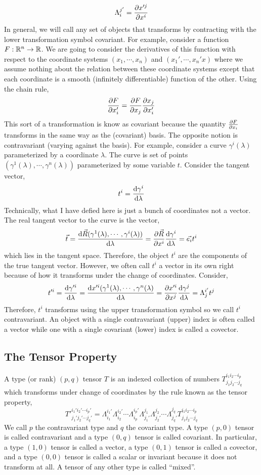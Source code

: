 \documentclass[11pt, a4paper]{article}
\begin{document}
\[ \Lambda^{j'}_{i} = \frac{\partial{x'^j}}{\partial{x^i}} \]
In general, we will call any set of objects that transforms by contracting with the lower transformation symbol covariant. For example,
consider a function $F : \mathbb{R}^n \to \mathbb{R}$. We are going to consider the derivatives of this function with respect to the coordinate systems $(x_1, \cdots, x_n)$ and $(x_1', \cdots, x_n'x)$ where we assume nothing about the relation between these coordinate systems except that each coordinate is a smooth (infinitely differentiable) function of the other. Using the chain rule,
\[ \frac{\partial{F}}{\partial{x'_i}} = \frac{\partial{F}}{\partial{x_j}} \frac{\partial{x_j}}{\partial{x'_i}} \]
This sort of a transformation is know as covariant because the quantity $\frac{\partial{F}}{\partial{x_i}}$ transforms in the same way as the (covariant) basis.
The opposite notion is contravariant (varying against the basis). For example, consider a curve $\gamma^i(\lambda)$ parameterized by a coordinate $\lambda$. The curve is set of points $(\gamma^1(\lambda), \cdots, \gamma^n(\lambda))$ parameterized by some variable $t$. Consider the tangent vector,
\[ t^i = \frac{\mathrm{d}\gamma^i}{\mathrm{d}\lambda} \]
Technically, what I have defied here is just a bunch of coordinates not a vector. The real tangent vector to the curve is the vector,
\[\vec{t} = \frac{\mathrm{d}\vec{R}(\gamma^1(\lambda), \cdots, \gamma^i(\lambda))}{\mathrm{d}\lambda} = \frac{\partial{\vec{R}}}{\partial{x^i}} \frac{\mathrm{d}\gamma^i}{\mathrm{d}\lambda} = \vec{e_i} t^i\] 
which lies in the tangent space. Therefore, the object $t^i$ are the components of the true tangent vector. However, we often call $t^i$ a vector in its own right because of how it transforms under the change of coordinates. Consider,
\[ t'^i = \frac{\mathrm{d}\gamma'^i}{\mathrm{d}\lambda} = \frac{\mathrm{d}x'^i(\gamma^1(\lambda), \cdots, \gamma^n(\lambda)}{\mathrm{d}\lambda} = \frac{\partial{x'^i}}{\partial{x^j}} \frac{\mathrm{d}\gamma^j}{\mathrm{d}\lambda} = \Lambda^{i'}_j t^j \]
Therefore, $t^i$ transforms using the upper transformation symbol so we call $t^i$ contravariant. An object with a single contravariant (upper) index is often called a vector while one with a single covariant (lower) index is called a covector. 

\subsection{The Tensor Property}

\begin{definition}
A type (or rank) $(p,q)$ tensor $T$ is an indexed collection of numbers $T^{i_1 i_2 \cdots i_p}_{j_1 j_2 \cdots j_q}$ which transforms under change of coordinates by the rule known as the tensor property,
\[ T'^{i_1' i_2' \cdots i_p'}_{j_1' j_2' \cdots j_q'} = \Lambda^{i_1'}_{i_1} \Lambda^{i_2'}_{i_2} \cdots \Lambda^{i_p'}_{i_p} \Lambda^{j_1}_{j_1'} \Lambda^{j_2}_{j_2'} \cdots \Lambda^{j_q}_{j_q'} T^{i_1 i_2 \cdots i_p}_{j_1 j_2 \cdots j_q}\]
We call $p$ the contravariant type and $q$ the covariant type. A type $(p, 0)$ tensor is called contravariant and a type $(0, q)$ tensor is called covariant. In particular, a type $(1, 0)$ tensor is called a vector, a type $(0, 1)$ tensor is called a covector, and a type $(0, 0)$ tensor is called a scalar or invariant because it does not transform at all. A tensor of any other type is called ``mixed''.
\end{definition}
\end{document}
